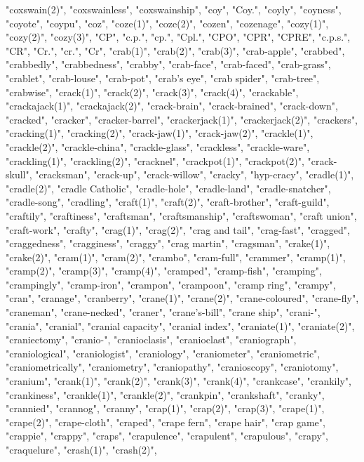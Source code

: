 "coxswain(2)",
"coxswainless",
"coxswainship",
"coy",
"Coy.",
"coyly",
"coyness",
"coyote",
"coypu",
"coz",
"coze(1)",
"coze(2)",
"cozen",
"cozenage",
"cozy(1)",
"cozy(2)",
"cozy(3)",
"CP",
"c.p.",
"cp.",
"Cpl.",
"CPO",
"CPR",
"CPRE",
"c.p.s.",
"CR",
"Cr.",
"cr.",
"Cr",
"crab(1)",
"crab(2)",
"crab(3)",
"crab-apple",
"crabbed",
"crabbedly",
"crabbedness",
"crabby",
"crab-face",
"crab-faced",
"crab-grass",
"crablet",
"crab-louse",
"crab-pot",
"crab's eye",
"crab spider",
"crab-tree",
"crabwise",
"crack(1)",
"crack(2)",
"crack(3)",
"crack(4)",
"crackable",
"crackajack(1)",
"crackajack(2)",
"crack-brain",
"crack-brained",
"crack-down",
"cracked",
"cracker",
"cracker-barrel",
"crackerjack(1)",
"crackerjack(2)",
"crackers",
"cracking(1)",
"cracking(2)",
"crack-jaw(1)",
"crack-jaw(2)",
"crackle(1)",
"crackle(2)",
"crackle-china",
"crackle-glass",
"crackless",
"crackle-ware",
"crackling(1)",
"crackling(2)",
"cracknel",
"crackpot(1)",
"crackpot(2)",
"crack-skull",
"cracksman",
"crack-up",
"crack-willow",
"cracky",
"hyp-cracy",
"cradle(1)",
"cradle(2)",
"cradle Catholic",
"cradle-hole",
"cradle-land",
"cradle-snatcher",
"cradle-song",
"cradling",
"craft(1)",
"craft(2)",
"craft-brother",
"craft-guild",
"craftily",
"craftiness",
"craftsman",
"craftsmanship",
"craftswoman",
"craft union",
"craft-work",
"crafty",
"crag(1)",
"crag(2)",
"crag and tail",
"crag-fast",
"cragged",
"craggedness",
"cragginess",
"craggy",
"crag martin",
"cragsman",
"crake(1)",
"crake(2)",
"cram(1)",
"cram(2)",
"crambo",
"cram-full",
"crammer",
"cramp(1)",
"cramp(2)",
"cramp(3)",
"cramp(4)",
"cramped",
"cramp-fish",
"cramping",
"crampingly",
"cramp-iron",
"crampon",
"crampoon",
"cramp ring",
"crampy",
"cran",
"cranage",
"cranberry",
"crane(1)",
"crane(2)",
"crane-coloured",
"crane-fly",
"craneman",
"crane-necked",
"craner",
"crane's-bill",
"crane ship",
"crani-",
"crania",
"cranial",
"cranial capacity",
"cranial index",
"craniate(1)",
"craniate(2)",
"craniectomy",
"cranio-",
"cranioclasis",
"cranioclast",
"craniograph",
"craniological",
"craniologist",
"craniology",
"craniometer",
"craniometric",
"craniometrically",
"craniometry",
"craniopathy",
"cranioscopy",
"craniotomy",
"cranium",
"crank(1)",
"crank(2)",
"crank(3)",
"crank(4)",
"crankcase",
"crankily",
"crankiness",
"crankle(1)",
"crankle(2)",
"crankpin",
"crankshaft",
"cranky",
"crannied",
"crannog",
"cranny",
"crap(1)",
"crap(2)",
"crap(3)",
"crape(1)",
"crape(2)",
"crape-cloth",
"craped",
"crape fern",
"crape hair",
"crap game",
"crappie",
"crappy",
"craps",
"crapulence",
"crapulent",
"crapulous",
"crapy",
"craquelure",
"crash(1)",
"crash(2)",

